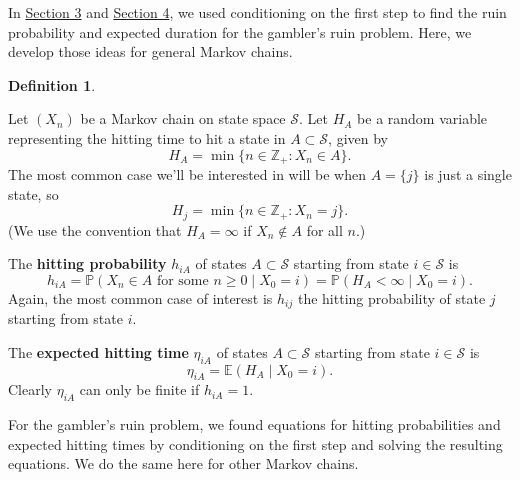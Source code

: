\documentclass[
  a4paper,
]{article}
\theoremstyle{definition}
\newtheorem{definition}{Definition}[section]
\theoremstyle{definition}
\theoremstyle{definition}
\theoremstyle{remark}
\begin{document}
In \protect\hyperlink{S03-gamblers-ruin}{Section 3} and \protect\hyperlink{S04-ldes}{Section 4}, we used conditioning on the first step to find the ruin probability and expected duration for the gambler's ruin problem. Here, we develop those ideas for general Markov chains.

\begin{definition}
\protect\hypertarget{def:hitting-defs}{}\label{def:hitting-defs}

Let \((X_n)\) be a Markov chain on state space \(\mathcal S\). Let \(H_{A}\) be a random variable representing the hitting time to hit a state in \(A \subset \mathcal S\), given by
\[ H_{A} = \min \{n \in \mathbb Z_+ : X_n \in A  \} . \]
The most common case we'll be interested in will be when \(A = \{j\}\) is just a single state, so
\[ H_{j} = \min \{n \in \mathbb Z_+ : X_n = j  \} . \]
(We use the convention that \(H_A = \infty\) if \(X_n \not\in A\) for all \(n\).)

The \textbf{hitting probability} \(h_{iA}\) of states \(A \subset \mathcal S\) starting from state \(i \in \mathcal S\) is
\[ h_{iA} = \mathbb P(X_n \in A \text{ for some $n \geq 0$} \mid X_0 = i) = \mathbb P(H_A < \infty \mid X_0 = i) .  \]
Again, the most common case of interest is \(h_{ij}\) the hitting probability of state \(j\) starting from state \(i\).

The \textbf{expected hitting time} \(\eta_{iA}\) of states \(A \subset \mathcal S\) starting from state \(i \in \mathcal S\) is
\[ \eta_{iA} = \mathbb E(H_A \mid X_0 = i) .  \]
Clearly \(\eta_{iA}\) can only be finite if \(h_{iA} = 1\).

\end{definition}

For the gambler's ruin problem, we found equations for hitting probabilities and expected hitting times by conditioning on the first step and solving the resulting equations. We do the same here for other Markov chains.
\end{document}
